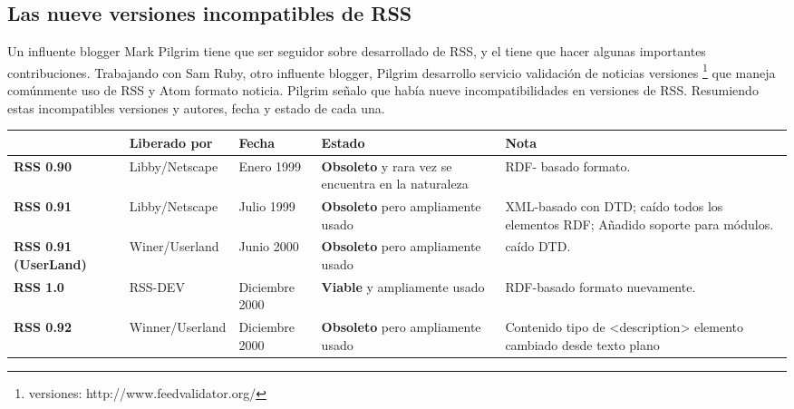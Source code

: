 \subsection{Las nueve versiones incompatibles de RSS}

Un influente blogger Mark Pilgrim tiene que ser seguidor sobre desarrollado de RSS,
y el tiene que hacer algunas importantes contribuciones. Trabajando con Sam Ruby,
otro influente blogger, Pilgrim desarrollo servicio validaci\'{o}n de noticias versiones
\footnote{versiones: http://www.feedvalidator.org/} que maneja com\'{u}nmente uso de RSS
y Atom formato noticia. Pilgrim se\~{n}alo que hab\'{i}a nueve incompatibilidades en
versiones de RSS. Resumiendo estas incompatibles versiones y autores, fecha y estado
de cada una.\cite{johnson2006rss}

\begin{minipage}[b]{\hsize}\centering

\begin{tabular}{>{\centering\arraybackslash}m{.05\linewidth} |>{\centering\arraybackslash}m{.17\linewidth}|>{\centering\arraybackslash}m{.1\linewidth}|>{\centering\arraybackslash}m{.2\linewidth}|>{\centering\arraybackslash}m{.4\linewidth}}

& \textbf{Liberado por} & \textbf{Fecha} & \textbf{Estado} & \textbf{Nota} \\
\hline

\textbf{RSS 0.90} & Libby/Netscape & Enero 1999 & \textbf{Obsoleto} y rara vez se encuentra en la naturaleza & RDF- basado formato. \\
\hline

\textbf{RSS 0.91 } & Libby/Netscape & Julio 1999 & \textbf{Obsoleto} pero ampliamente usado & XML-basado con DTD; ca\'{i}do todos los elementos RDF; A\~{n}adido soporte para m\'{o}dulos. \\
\hline 

\textbf{RSS 0.91 (UserLand) } & Winer/Userland & Junio 2000 & \textbf{Obsoleto} pero ampliamente usado & ca\'{i}do DTD. \\
\hline 

\textbf{RSS 1.0} & RSS-DEV & Diciembre 2000 & \textbf{Viable} y ampliamente usado & RDF-basado formato nuevamente.\\
\hline

\textbf{RSS 0.92} & Winner/Userland & Diciembre 2000 & \textbf{Obsoleto} pero ampliamente usado & Contenido tipo de <description> elemento cambiado desde texto plano\\
\hline


\end{tabular}
\end{minipage}
